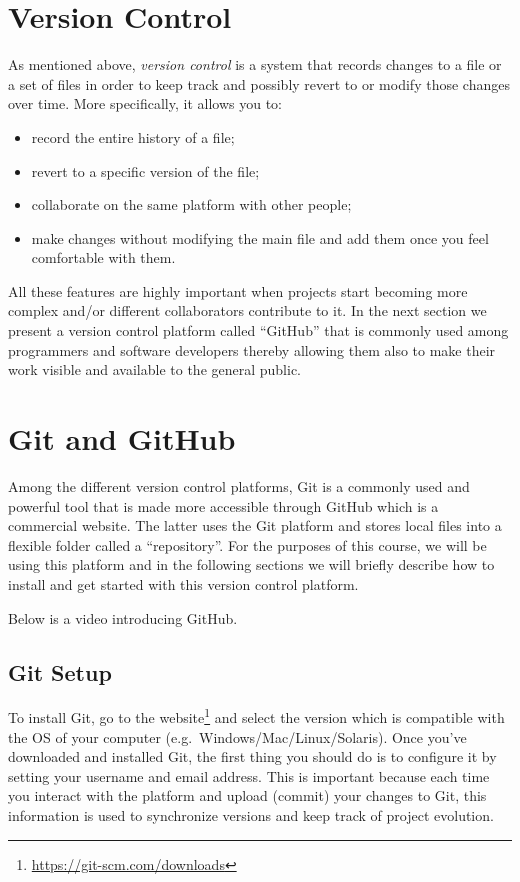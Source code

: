 \documentclass[12pt,]{krantz}
\providecommand{\tightlist}{%
  \setlength{\itemsep}{0pt}\setlength{\parskip}{0pt}}
\renewcommand{\href}[2]{#2\footnote{\url{#1}}}
\begin{document}
\section{Version Control}\label{version-control}

As mentioned above, \emph{version control} is a system that records
changes to a file or a set of files in order to keep track and possibly
revert to or modify those changes over time. More specifically, it
allows you to:

\begin{itemize}
\tightlist
\item
  record the entire history of a file;
\item
  revert to a specific version of the file;
\item
  collaborate on the same platform with other people;
\item
  make changes without modifying the main file and add them once you
  feel comfortable with them.
\end{itemize}

All these features are highly important when projects start becoming
more complex and/or different collaborators contribute to it. In the
next section we present a version control platform called ``GitHub''
that is commonly used among programmers and software developers thereby
allowing them also to make their work visible and available to the
general public.

\section{Git and GitHub}\label{git-and-github}

Among the different version control platforms, Git is a commonly used
and powerful tool that is made more accessible through GitHub which is a
commercial website. The latter uses the Git platform and stores local
files into a flexible folder called a ``repository''. For the purposes
of this course, we will be using this platform and in the following
sections we will briefly describe how to install and get started with
this version control platform.

Below is a video introducing GitHub.

\subsection{Git Setup}\label{git-setup}

To install Git, go to the \href{https://git-scm.com/downloads}{website}
and select the version which is compatible with the OS of your computer
(e.g.~Windows/Mac/Linux/Solaris). Once you've downloaded and installed
Git, the first thing you should do is to configure it by setting your
username and email address. This is important because each time you
interact with the platform and upload (commit) your changes to Git, this
information is used to synchronize versions and keep track of project
evolution.
\end{document}
